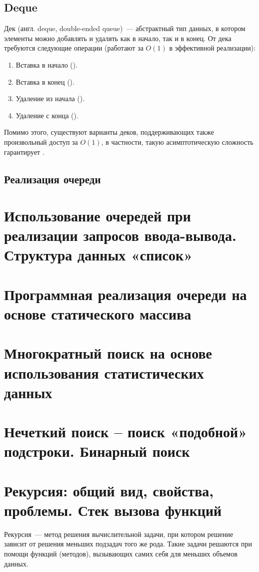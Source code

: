 \subsection{Deque}
Дек (англ. deque, double-ended queue)~--- абстрактный тип данных, в котором элементы можно добавлять и удалять как в начало, так и в конец.
От дека требуются следующие операции (работают за \(O(1)\) в эффективной реализации):
\begin{enumerate}
  \item Вставка в начало ().
  \item Вставка в конец ().
  \item Удаление из начала ().
  \item Удаление с конца ().
\end{enumerate}

Помимо этого, существуют варианты деков, поддерживающих также произвольный доступ за \(O(1)\), в частности, такую асимптотическую
сложность гарантирует .

\subsection{Реализация очереди}

\section{Использование очередей при реализации запросов ввода-вывода. Структура данных «список»}
\section{Программная реализация очереди на основе статического массива}
\section{Многократный поиск на основе использования статистических данных}
\section{Нечеткий поиск – поиск «подобной» подстроки. Бинарный поиск}

\section{Рекурсия: общий вид, свойства, проблемы. Стек вызова функций}
Рекурсия~--- метод решения вычислительной задачи, при котором решение зависит от решения меньших подзадач того же рода. Такие задачи решаются
при помощи функций (методов), вызывающих самих себя для меньших объемов данных.

